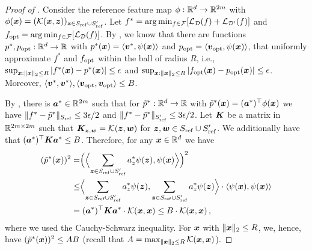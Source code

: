 \documentclass[11pt]{article} %
\numberwithin{equation}{section}
\begin{document}
\begin{proof}[Proof of ]
    Consider the reference feature map $\phi: \mathbb{R}^d \to \mathbb{R}^{2m}$ with $\phi({\bm{x}}) = (\mathcal{K}({\bm{x}},{\bm{z}}))_{{\bm{z}}\in S_{\mathrm{ref}}\cup S_{\mathrm{ref}}'}$. Let $f^*= \arg \min_{f\in{\mathcal{F}}} [{\mathcal{L}}_{{\mathcal{D}}}(f)+ {\mathcal{L}}_{{\mathcal{D}}'}(f)]$ and $f_{\mathrm{opt}} = \arg \min_{f\in{\mathcal{F}}} [{\mathcal{L}}_{{\mathcal{D}}}(f)]$. By , we know that there are functions $p^*, p_{\mathrm{opt}} :\mathbb{R}^d \to \mathbb{R}$ with $p^*({\bm{x}}) = \langle {\bm{v}}^*, \psi({\bm{x}})\rangle$ and $p_{\mathrm{opt}} = \langle {\bm{v}}_{\mathrm{opt}}, \psi({\bm{x}})\rangle$, that uniformly approximate $f^*$ and $f_{\mathrm{opt}}$ within the ball of radius $R$, i.e., $\sup_{{\bm{x}}:\|{\bm{x}}\|_2\le R}|f^*({\bm{x}}) - p^*({\bm{x}})| \le {\epsilon}$ and $\sup_{{\bm{x}}:\|{\bm{x}}\|_2\le R}|f_{\mathrm{opt}}({\bm{x}}) - p_{\mathrm{opt}}({\bm{x}})| \le {\epsilon}$. Moreover, $\langle {\bm{v}}^*, {\bm{v}}^*\rangle, \langle {\bm{v}}_{\mathrm{opt}}, {\bm{v}}_{\mathrm{opt}}\rangle \le B$.

    By , there is ${\bm{a}}^*\in \mathbb{R}^{2m}$ such that for $\tilde{p}^*:\mathbb{R}^d\to \mathbb{R}$ with $\tilde{p}^*({\bm{x}}) = ({{\bm{a}}^*})^\top{\phi({\bm{x}})}$ we have $\|f^*-\tilde{p}^*\|_{S_{\mathrm{ref}}} \le 3{\epsilon}/2$ and $\|f^*-\tilde{p}^*\|_{S_{\mathrm{ref}}'} \le 3{\epsilon}/2$. Let ${\bm{K}}$ be a matrix in $\mathbb{R}^{2m\times 2m}$ such that ${\bm{K}}_{{\bm{z}},{\bm{w}}} = \mathcal{K}({\bm{z}},{\bm{w}})$ for ${\bm{z}},{\bm{w}}\in S_{\mathrm{ref}}\cup S_{\mathrm{ref}}'$. We additionally have that $({\bm{a}}^*)^\top {\bm{K}} {\bm{a}}^* \le B$. Therefore, for any ${\bm{x}}\in\mathbb{R}^d$ we have 
    \begin{align*}
        (\tilde{p}^*({\bm{x}}))^2 &= \Bigr(\Bigr\langle{\sum_{{\bm{z}}\in S_{\mathrm{ref}}\cup S_{\mathrm{ref}}'} a^*_z \psi({\bm{z}}) }, {\psi({\bm{x}})}\Bigr\rangle\Bigr)^2 \\
        &\le \Bigr\langle{\sum_{{\bm{z}}\in S_{\mathrm{ref}}\cup S_{\mathrm{ref}}'} a^*_z \psi({\bm{z}}) }, {\sum_{{\bm{z}}\in S_{\mathrm{ref}}\cup S_{\mathrm{ref}}'} a^*_z \psi({\bm{z}})}\Bigr\rangle \cdot \langle \psi({\bm{x}}), \psi({\bm{x}})\rangle \\
        &= ({\bm{a}}^*)^\top {\bm{K}} {\bm{a}}^* \cdot \mathcal{K}({\bm{x}},{\bm{x}}) \le B\cdot \mathcal{K}({\bm{x}},{\bm{x}})\,,
    \end{align*}
    where we used the Cauchy-Schwarz inequality. For ${\bm{x}}$ with $\|{\bm{x}}\|_2\le R$, we, hence, have $(\tilde{p}^*({\bm{x}}))^2 \le AB$ (recall that $A = \max_{\|{\bm{x}}\|_2\le R}\mathcal{K}({\bm{x}},{\bm{x}})$).


\end{proof}
\end{document}
